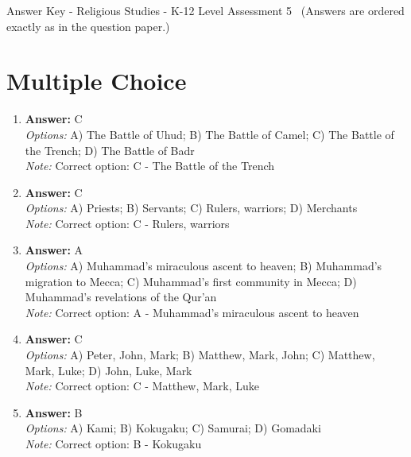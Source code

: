 \documentclass[12pt]{article}
\begin{document}
\begin{center}
Answer Key - Religious Studies - K-12 Level Assessment 5 \
\small (Answers are ordered exactly as in the question paper.)
\end{center}

\section*{Multiple Choice}
\begin{enumerate}[label=\arabic*.]
\item \textbf{Answer:} C
\\ \textit{Options:} A) The Battle of Uhud; B) The Battle of Camel; C) The Battle of the Trench; D) The Battle of Badr
\\ \textit{Note:} Correct option: C - The Battle of the Trench
\item \textbf{Answer:} C
\\ \textit{Options:} A) Priests; B) Servants; C) Rulers, warriors; D) Merchants
\\ \textit{Note:} Correct option: C - Rulers, warriors
\item \textbf{Answer:} A
\\ \textit{Options:} A) Muhammad's miraculous ascent to heaven; B) Muhammad's migration to Mecca; C) Muhammad's first community in Mecca; D) Muhammad's revelations of the Qur'an
\\ \textit{Note:} Correct option: A - Muhammad's miraculous ascent to heaven
\item \textbf{Answer:} C
\\ \textit{Options:} A) Peter, John, Mark; B) Matthew, Mark, John; C) Matthew, Mark, Luke; D) John, Luke, Mark
\\ \textit{Note:} Correct option: C - Matthew, Mark, Luke
\item \textbf{Answer:} B
\\ \textit{Options:} A) Kami; B) Kokugaku; C) Samurai; D) Gomadaki
\\ \textit{Note:} Correct option: B - Kokugaku
\end{enumerate}
\end{document}
